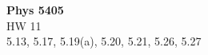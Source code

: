 \documentclass[12pt]{article}
\begin{document}
\begin{center}
{\bf Phys 5405}\\
HW 11 \\
5.13, 5.17, 5.19(a), 5.20, 5.21, 5.26, 5.27

\end{center}

\newpage
{}

\newpage
{}

\newpage
{}

\newpage
{}

\newpage
{}

\newpage
{}
\end{document}
